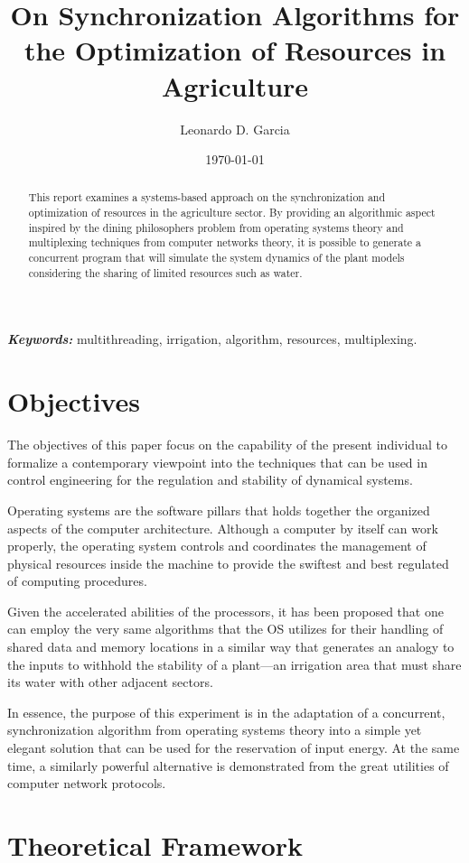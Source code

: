\documentclass[12pt]{article}
\title{On Synchronization Algorithms for the Optimization of Resources in Agriculture}
\author{Leonardo D. Garcia}
\date{\today}
\begin{document}
\maketitle

\begin{abstract}
This report examines a systems-based approach on the synchronization and optimization of resources in the agriculture sector. By providing an algorithmic aspect inspired by the dining philosophers problem from operating systems theory and multiplexing techniques from computer networks theory, it is possible to generate a concurrent program that will simulate the system dynamics of the plant models considering the sharing of limited resources such as water.
\end{abstract}

\small
\textbf{\textit{Keywords:}} multithreading, irrigation, algorithm, resources, multiplexing.

\section{Objectives}
The objectives of this paper focus on the capability of the present individual to formalize a contemporary viewpoint into the techniques that can be used in control engineering for the regulation and stability of dynamical systems.

Operating systems are the software pillars that holds together the organized aspects of the computer architecture. Although a computer by itself can work properly, the operating system controls and coordinates the management of physical resources inside the machine to provide the swiftest and best regulated of computing procedures.

Given the accelerated abilities of the processors, it has been proposed that one can employ the very same algorithms that the OS utilizes for their handling of shared data and memory locations in a similar way that generates an analogy to the inputs to withhold the stability of a plant—an irrigation area that must share its water with other adjacent sectors.

In essence, the purpose of this experiment is in the adaptation of a concurrent, synchronization algorithm from operating systems theory into a simple yet elegant solution that can be used for the reservation of input energy. At the same time, a similarly powerful alternative is demonstrated from the great utilities of computer network protocols.

\section{Theoretical Framework}
\end{document}
